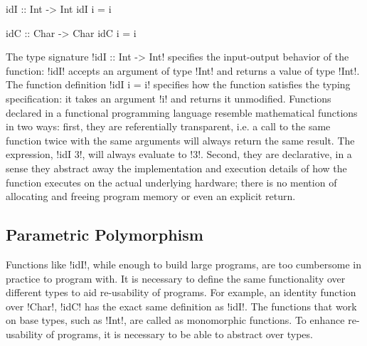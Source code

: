 \documentclass[screen,nonacm,manuscript,review]{acmart} %
\begin{document}
\begin{minipage}{0.5\linewidth}
\begin{CenteredBox}
\begin{code}
idI :: Int -> Int
idI i = i
\end{code}
\end{CenteredBox}
\end{minipage}%
\begin{minipage}{0.5\linewidth}
\begin{CenteredBox}
\begin{code}
idC :: Char -> Char
idC i = i
\end{code}
\end{CenteredBox}
\end{minipage}

The type signature !idI :: Int -> Int! specifies the input-output behavior of the
function: !idI! accepts an argument of type !Int! and returns a value of type !Int!. The
function definition !idI i = i! specifies how the function satisfies the typing
specification: it takes an argument !i! and returns it unmodified. Functions declared in a
functional programming language resemble mathematical functions in two ways: first, they
are referentially transparent, i.e. a call to the same function twice with the same
arguments will always return the same result. The expression, !idI 3!, will always
evaluate to !3!. Second, they are declarative, in a sense they abstract away the
implementation and execution details of how the function executes on the actual underlying
hardware; there is no mention of allocating and freeing program memory or even an explicit
return.

\subsection{Parametric Polymorphism}
Functions like !idI!, while enough to build large programs, are too cumbersome in
practice to program with. It is necessary to define the same functionality over
different types to aid re-usability of programs. For example, an
identity function over !Char!, !idC! has the exact same
definition as !idI!. The functions that work on base types, such as !Int!, are called as
monomorphic functions. To enhance re-usability of programs, it is necessary to be able to
abstract over types.
\end{document}
